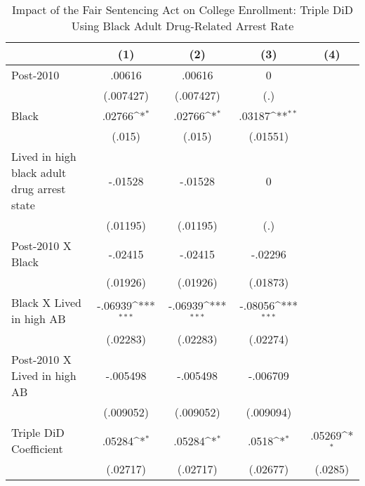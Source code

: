 \begin{table}[htbp]\centering
\def\sym#1{\ifmmode^{#1}\else\(^{#1}\)\fi}
\caption{Impact of the Fair Sentencing Act on College Enrollment: Triple DiD Using Black Adult Drug-Related Arrest Rate}
\begin{tabular}{l*{4}{c}}
\hline\hline
                    &\multicolumn{1}{c}{(1)}         &\multicolumn{1}{c}{(2)}         &\multicolumn{1}{c}{(3)}         &\multicolumn{1}{c}{(4)}         \\
\hline
Post-2010           &      .00616         &      .00616         &           0         &                     \\
                    &   (.007427)         &   (.007427)         &         (.)         &                     \\
[1em]
Black               &      .02766\sym{*}  &      .02766\sym{*}  &      .03187\sym{**} &                     \\
                    &      (.015)         &      (.015)         &    (.01551)         &                     \\
[1em]
Lived in high black adult drug arrest state&     -.01528         &     -.01528         &           0         &                     \\
                    &    (.01195)         &    (.01195)         &         (.)         &                     \\
[1em]
Post-2010 X Black   &     -.02415         &     -.02415         &     -.02296         &                     \\
                    &    (.01926)         &    (.01926)         &    (.01873)         &                     \\
[1em]
Black X Lived in high AB&     -.06939\sym{***}&     -.06939\sym{***}&     -.08056\sym{***}&                     \\
                    &    (.02283)         &    (.02283)         &    (.02274)         &                     \\
[1em]
Post-2010 X Lived in high AB&    -.005498         &    -.005498         &    -.006709         &                     \\
                    &   (.009052)         &   (.009052)         &   (.009094)         &                     \\
[1em]
Triple DiD Coefficient&      .05284\sym{*}  &      .05284\sym{*}  &       .0518\sym{*}  &      .05269\sym{*}  \\
                    &    (.02717)         &    (.02717)         &    (.02677)         &     (.0285)         \\

\end{tabular}
\end{table}
